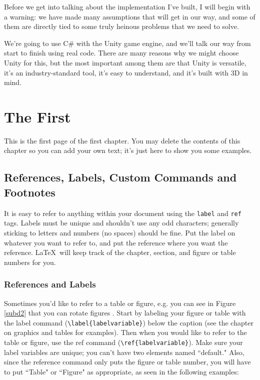 \documentclass[12pt,twoside]{reedthesis}
\begin{document}
Before we get into talking about the implementation I've built, I will begin with a warning: we have made many assumptions that will get in our way, and some of them are directly tied to some truly heinous problems that we need to solve.

We're going to use C\# with the Unity game engine, and we'll talk our way from start to finish using real code. There are many reasons why we might choose Unity for this, but the most important among them are that Unity is versatile, it's an industry-standard tool, it's easy to understand, and it's built with 3D in mind.

    \chapter{The First}
    	This is the first page of the first chapter. You may delete the contents of this chapter so you can add your own text; it's just here to show you some examples. 
	
\section{References, Labels, Custom Commands and Footnotes}
It is easy to refer to anything within your document using the \texttt{label} and \texttt{ref} tags.  Labels must be unique and shouldn't use any odd characters; generally sticking to letters and numbers (no spaces) should be fine. Put the label on whatever you want to refer to, and put the reference where you want the reference. \LaTeX\ will keep track of the chapter, section, and figure or table numbers for you. 

\subsection{References and Labels}
Sometimes you'd like to refer to a table or figure, e.g. you can see in Figure \ref{subd2} that you can rotate figures . Start by labeling your figure or table with the label command (\verb=\label{labelvariable}=) below the caption (see the chapter on graphics and tables for examples). Then when you would like to refer to the table or figure, use the ref command (\verb=\ref{labelvariable}=). Make sure your label variables are unique; you can't have two elements named ``default." Also, since the reference command only puts the figure or table number, you will have to put  ``Table" or ``Figure" as appropriate, as seen in the following examples:
\end{document}
